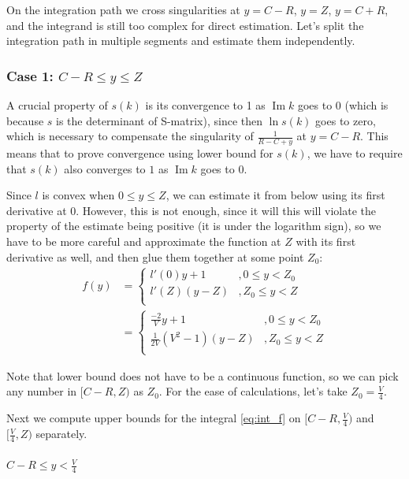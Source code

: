 \documentclass{gCOV2e}
\theoremstyle{plain}%
\theoremstyle{definition}
\theoremstyle{remark}
\renewcommand{\Im}{\operatorname{Im}}
\begin{document}
On the integration path we cross singularities at $y = C - R$, $y = Z$, $y = C + R$, and the integrand is still too complex for direct estimation. Let's split the integration path in multiple segments and estimate them independently.

\subsubsection{Case 1: $C - R \le y \le Z$}
A crucial property of $s(k)$ is its convergence to 1 as $\Im k$ goes to 0 (which is because $s$ is the determinant of S-matrix), since then $\ln s(k)$ goes to zero, which is necessary to compensate the singularity of $\frac{1}{R - C + y}$ at $y = C - R$. 
This means that to prove convergence using lower bound for $s(k)$, we have to require that $s(k)$ also converges to $1$ as $\Im k$ goes to $0$.

Since $l$ is convex when $0 \le y \le Z$, we can estimate it from below using its first derivative at $0$. However, this is not enough, since it will this will violate the property of the estimate being positive (it is under the logarithm sign), so we have to be more careful and approximate the function at $Z$ with its first derivative as well, and then glue them together at some point $Z_0$:
\begin{align*}
f(y)
& = 
\begin{cases}
l'(0) y + 1   &, 0 \le y < Z_0  \\
l'(Z) (y - Z) &, Z_0 \le y < Z \\
\end{cases}
\\
& =
\begin{cases}
\frac{-2}{V} y + 1   &, 0 \le y < Z_0  \\
\frac{1}{2 V}(V^2 - 1) (y - Z) &, Z_0 \le y < Z \\
\end{cases}
\end{align*}

Note that lower bound does not have to be a continuous function, so we can pick any number in $[C - R, Z)$ as $Z_0$. For the ease of calculations, let's take $Z_0 = \frac{V}{4}$.

Next we compute upper bounds for the integral \ref{eq:int_f} on $[C - R, \frac{V}{4})$ and $[\frac{V}{4}, Z)$ separately.

\paragraph{$C - R \le y < \frac{V}{4}$}
\end{document}

